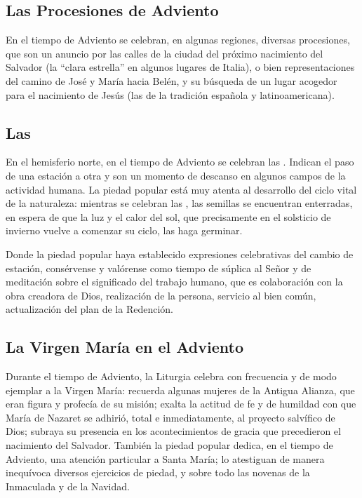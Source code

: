 \begin{introstyle}
	\subsection{Las Procesiones de Adviento}
	
	En el tiempo de Adviento se celebran, en algunas regiones, diversas	procesiones, que son un anuncio por las calles de la ciudad del próximo	nacimiento del Salvador (la ``clara estrella'' en algunos lugares de Italia), o bien representaciones del camino de José y María hacia Belén,
	y su búsqueda de un lugar acogedor para el nacimiento de Jesús (las	 de la tradición española y latinoamericana).
	

	\subsection{Las }
	
	En el hemisferio norte, en el tiempo de Adviento se celebran las . Indican el paso de una estación a otra y son	un momento de descanso en algunos campos de la actividad humana. La piedad popular está muy atenta al desarrollo del ciclo vital de la naturaleza: mientras se celebran las , las semillas se encuentran enterradas, en espera de que la luz y el calor del sol, que precisamente en el solsticio de invierno vuelve a comenzar su ciclo, las haga germinar.
	
	Donde la piedad popular haya establecido expresiones celebrativas del cambio de estación, consérvense y valórense como tiempo de súplica al Señor y de meditación sobre el significado del trabajo humano, que es colaboración con la obra creadora de Dios, realización de la persona, servicio al bien común, actualización del plan de la Redención.
	
	
	\subsection{La Virgen María en el Adviento}
	
	Durante el tiempo de Adviento, la Liturgia celebra con frecuencia y de modo ejemplar a la Virgen María: recuerda algunas mujeres de la Antigua Alianza, que eran figura y profecía de su misión; exalta la actitud de fe y de humildad con que María de Nazaret se adhirió, total e
	inmediatamente, al proyecto salvífico de Dios; subraya su presencia en los acontecimientos de gracia que precedieron el nacimiento del Salvador. También la piedad popular dedica, en el tiempo de Adviento,	una atención particular a Santa María; lo atestiguan de manera inequívoca diversos ejercicios de piedad, y sobre todo las novenas de la Inmaculada y de la Navidad.
	

\end{introstyle}
